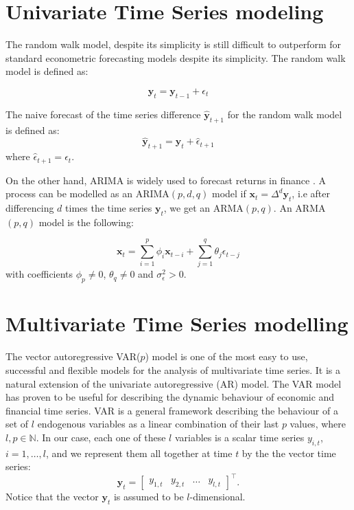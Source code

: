 \section{Univariate Time Series modeling}

The random walk model, despite its simplicity is still difficult to outperform for standard econometric forecasting models \cite{lo2011} despite its simplicity. The random walk model is defined as:

\begin{equation}
\mathbf{y}_t = \mathbf{y}_{t-1} + \epsilon_{t}
\label{rwmodel}
\end{equation}

The naive forecast of the time series difference $\hat{\mathbf{y}}_{t+1}$ for the random walk model is defined as:
\begin{equation}
\hat{\mathbf{y}}_{t+1} = \mathbf{y}_t + \hat{\epsilon}_{t+1} 
\end{equation}
\noindent where  $\hat{\epsilon}_{t+1} = \epsilon_{t}$.

On the other hand, ARIMA is widely used to forecast returns in finance \cite{tsay2005}. A process can be modelled as an ARIMA$(p,d,q)$ model if $\mathbf{x}_t=\Delta^d \mathbf{y}_t $, i.e after differencing $d$ times the time series $\mathbf{y}_t$,  we get an ARMA$(p,q)$. An ARMA$(p,q)$ model is the following:

\begin{equation}
\mathbf{x}_t = \sum_{i=1}^p \phi_i \mathbf{x}_{t-i}  +  \sum_{j=1}^q \theta_j \epsilon_{t-j}  
\end{equation}
\noindent with coefficients $\phi_p \neq 0$, $\theta_q \neq 0$ and $\sigma_{\epsilon}^2 > 0$.

\section{Multivariate Time Series modelling}

The vector autoregressive VAR($p$) model \cite{sims1980} is one of the most easy to use, successful and flexible models for the analysis of multivariate time series. It is a natural extension of the univariate autoregressive (AR) model. The VAR model has proven to be useful for describing the dynamic behaviour of economic and financial time series.
VAR is a general framework describing the behaviour of a
set of $l$ endogenous variables as a linear combination of their last $p$
values, where $l,p\in\mathbb{N}$. 
In our case, each one of these $l$ variables is a scalar time series
$y_{i,t}$, $i=1,\dots,l$, and we represent them all together
at time $t$ by the the vector time series:
\begin{equation*}
\label{eq:variables}
\mathbf{y}_t = 
\begin{bmatrix} y_{1,t} & y_{2,t} & \dots & y_{l,t} \end{bmatrix}^\top.
\end{equation*}
\noindent
Notice that the vector $\mathbf{y}_t$ is assumed to be $l$-dimensional.

